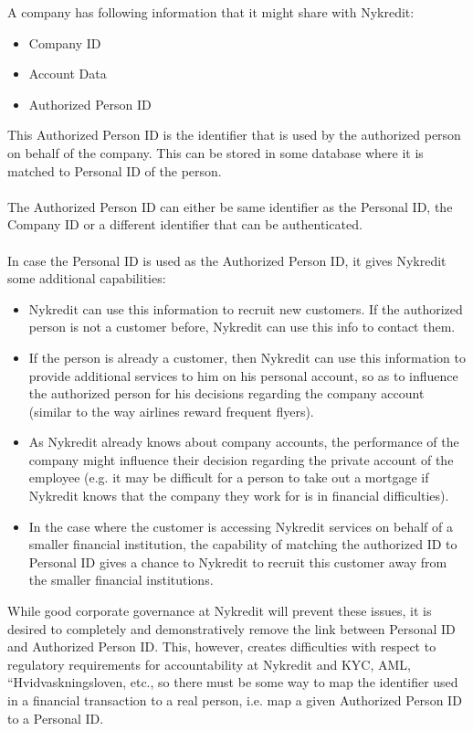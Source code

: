 A company has following information that it might share with Nykredit:
\begin{itemize}
	\item Company ID	
	\item Account Data
	\item Authorized Person ID
\end{itemize}
This Authorized Person ID is the identifier that is used by the authorized person on behalf of the company. This can be stored in some database where it is matched to Personal ID of the person.
\\
\\The Authorized Person ID can either be same identifier as the Personal ID, the Company ID or a different identifier that can be authenticated. 
\\
\\In case the Personal ID is used as the Authorized Person ID, it gives Nykredit some additional capabilities:
\begin{itemize}
\item Nykredit can use this information to recruit new customers. If the authorized person is not a customer before, Nykredit can use this info to contact them.
\item If the person is already a customer, then Nykredit can use this information to provide additional services to him on his personal account, so as to influence the authorized person for his decisions regarding the company account (similar to the way airlines reward frequent flyers).
\item As Nykredit already knows about company accounts, the performance of the company might influence their decision regarding the private account of the employee (e.g. it may be difficult for a person to take out a mortgage if Nykredit knows that the company they work for is in financial difficulties).
\item In the case where the customer is accessing Nykredit services on behalf of a smaller financial institution, the capability of matching the authorized ID to Personal ID gives a chance to Nykredit to recruit this customer away from the smaller financial institutions.
\end{itemize}
While good corporate governance at Nykredit will prevent these issues, it is desired to completely and demonstratively remove the link between Personal ID and Authorized Person ID. This, however, creates difficulties with respect to regulatory requirements for accountability at Nykredit and KYC, AML, “Hvidvaskningsloven, etc., so there must be some way to map the identifier used in a financial transaction to a real person, i.e. map a given Authorized Person ID to a Personal ID.


